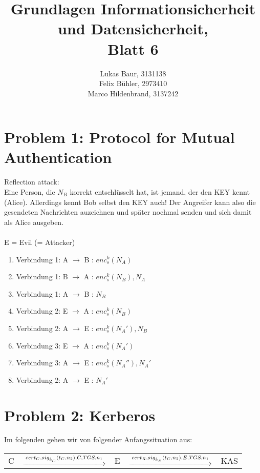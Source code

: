\documentclass[12pt,pdftex,a4paper]{article}
\title{ Grundlagen Informationsicherheit und Datensicherheit,\\ Blatt 6}
\author{Lukas Baur, 3131138\\
	Felix Bühler, 2973410\\
	Marco Hildenbrand, 3137242}
\newcommand\tab[1][1cm]{\hspace*{#1}}
\begin{document}
\maketitle
\pagebreak
\section*{Problem 1: Protocol for Mutual Authentication}
Reflection attack:\\
Eine Person, die $ N_B $ korrekt entschlüsselt hat, ist jemand, der den KEY kennt (Alice). Allerdings kennt Bob selbst den KEY auch! Der Angreifer kann also die gesendeten Nachrichten auzeichnen und später nochmal senden und sich damit als Alice ausgeben.
\\~\\
E = Evil (= Attacker)
\begin{enumerate}
	\item Verbindung 1: A $ \rightarrow $ B \tab : $ enc_s^k(N_A) $
	\item Verbindung 1: B $ \rightarrow $ A \tab : $ enc_s^k(N_B), N_A $
	\item Verbindung 1: A $ \rightarrow $ B \tab : $ N_B $
	\setlength{\itemsep}{20pt}
	\item Verbindung 2: E $ \rightarrow $ A \tab : $ enc_s^k(N_B) $
	\setlength{\itemsep}{5pt}
	\item Verbindung 2: A $ \rightarrow $ E \tab : $ enc_s^k(N_A'), N_B $
	\item Verbindung 3: E $ \rightarrow $ A \tab : $ enc_s^k(N_A') $
	\item Verbindung 3: A $ \rightarrow $ E \tab : $ enc_s^k(N_A''), N_A' $
	\item Verbindung 2: A $ \rightarrow $ E \tab : $ N_A' $
\end{enumerate}

\pagebreak
\section*{Problem 2: Kerberos}

Im folgenden gehen wir von folgender Anfangssituation aus:\\
\begin{tabular}{|c|c|c|c|c|}
C &  $\xlongrightarrow{cert_{C}, sig_{\hat{k}_{C}}(t_{C}, n_{2}), C, TGS, n_{1}}$  & E & $\xlongrightarrow{cert_{E}, sig_{\hat{k}_{E}}(t_{C}, n_{2}), E, TGS, n_{1}}$   & KAS \\ 
\end{tabular} 
\end{document}

